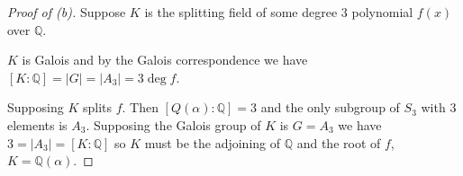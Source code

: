 \begin{proof}[Proof of (b)]
    Suppose $K$ is the splitting field of some 
    degree $3$ polynomial $f(x)$ over $\mathbb Q$. 

    $K$ is Galois and by the Galois correspondence we have 
    $[K:\mathbb Q] = |G| = |A_3| = 3 \deg f$. 

    Supposing $K$ splits $f$. Then $[Q(\alpha) : \mathbb Q] = 
    3$ and the only subgroup of $S_3$ with $3$ elements is $A_3$. 
    Supposing the Galois group of $K$ is $G = A_3$ we have 
    $3 = |A_3| = [K:\mathbb Q]$ so $K$ must be the adjoining of 
    $\mathbb Q$ and the root of $f$, $K = \mathbb Q(\alpha)$.
\end{proof}


